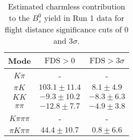 \begin{table}[h]
  \centering
  \begin{tabular}{ccc}
      \toprule
      Mode & $\mathrm{FDS} > 0$ & $\mathrm{FDS} > 3\sigma$ \\
      \midrule
      $K\pi$ & \-- & \-- \\
      $\pi K$ & $103.1 \pm 11.4$ & $8.1 \pm 4.9$ \\
      $KK$ & $-9.3 \pm 10.2$ & $-8.3 \pm 6.3$ \\
      $\pi\pi$ & $-12.8 \pm 7.7$ & $-4.9 \pm 3.8$ \\
      $K\pi\pi\pi$ & \-- & \-- \\
      $\pi K\pi\pi$ & $44.4 \pm 10.7$ & $0.8 \pm 6.6$ \\
      \bottomrule
  \end{tabular}
  \caption{\small Estimated charmless contribution to the $B^{0}_{s}$ yield in Run 1 data for flight distance significance cuts of 0  and $3\sigma$.}
\label{tab:charmless_yields_Bs_run_1}
\end{table}
